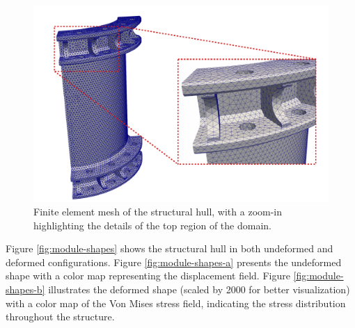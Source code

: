 \documentclass[english,11pt,3p,number,sort&compress]{elsarticle}
\begin{document}
\begin{figure}[h]
	\centering
	\includegraphics[scale=0.75]{hull-mesh.pdf}
	\caption{Finite element mesh of the structural hull, with a zoom-in highlighting the details of the top region of the domain.}
	\label{fig:module-mesh}
\end{figure}

Figure \ref{fig:module-shapes} shows the structural hull in both undeformed and deformed configurations. Figure \ref{fig:module-shapes-a} presents the undeformed shape with a color map representing the displacement field. Figure \ref{fig:module-shapes-b} illustrates the deformed shape (scaled by 2000 for better visualization) with a color map of the Von Mises stress field, indicating the stress distribution throughout the structure.
\end{document}
